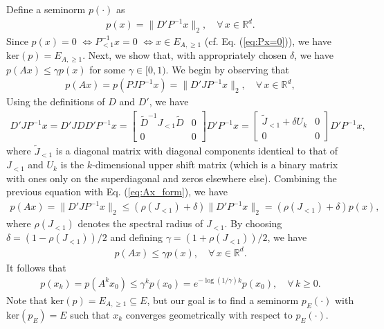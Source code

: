\documentclass[11 pt]{article}
\begin{document}
\begin{itemize}
		Define a seminorm $p(\cdot)$ as
		\begin{align}\label{eq:def:norm}
			p(x)= \| D' P^{-1} x \|_2, \quad \forall\, x \in  \mathbb{R}^d.
		\end{align}
		Since $p(x)=0$ $\Leftrightarrow P_{<1}^{-1}x=0$ $\Leftrightarrow x\in E_{A,\geq 1}$ (cf. Eq. (\ref{eq:Px=0})), we have $\text{ker}(p)=E_{A,\geq 1}$. 
		Next, we show that, with appropriately chosen $\delta$, we have $p(Ax)\leq \gamma p(x)$ for some $\gamma\in [0,1)$. We begin by observing that
		\begin{align}\label{eq:Ax_form}
			p(Ax)=p(PJP^{-1}x)=\|D'JP^{-1}x\|_2,\quad \forall\, x\in \mathbb{R}^d,
		\end{align}
		Using the definitions of $D$ and $D'$, we have
		\begin{align*}
			D'J P^{-1} x=D'JDD'P^{-1}x
			=\begin{bmatrix}
				\tilde{D}^{-1} J_{<1} \tilde{D}&  0\\
				0 & 0
			\end{bmatrix}D'P^{-1}x=\begin{bmatrix}
				\tilde{J}_{<1}+\delta U_k&  0\\
				0 & 0
			\end{bmatrix}D'P^{-1}x,
		\end{align*} 
		where $\tilde{J}_{<1}$ is a diagonal matrix with diagonal components identical to that of $J_{<1}$ and $U_k$ is the $k$-dimensional upper shift matrix (which is a binary matrix with ones only on the superdiagonal and zeros elsewhere else). Combining the previous equation with Eq. (\ref{eq:Ax_form}), we have
		\begin{align*}
			p(Ax)=\|D'JP^{-1}x\|_2\leq (\rho(J_{<1})+\delta)\|D'P^{-1}x\|_2=(\rho(J_{<1})+\delta) p(x),
		\end{align*}
		where $\rho(J_{<1})$ denotes the spectral radius of $J_{<1}$.
		By choosing $\delta=(1-\rho(J_{<1}))/2$ and defining $\gamma=(1+\rho(J_{<1}))/2$, we have  
		\begin{align*}
			p(Ax)\leq \gamma p(x),\quad \forall\,x\in \mathbb{R}^d.
		\end{align*}
		It follows that 
		\begin{align}\label{eq:geo_p_A>1}
			p(x_k)=p(A^kx_0)\leq \gamma^kp(x_0)=e^{-\log(1/\gamma)k}p(x_0),\quad \forall\,k\geq 0.
		\end{align}
		Note that $\text{ker}(p)=E_{A,\geq 1}\subseteq E$, but our goal is to find a seminorm $p_E(\cdot)$ with $\text{ker}(p_E)=E$ such that $x_k$ converges geometrically with respect to $p_E(\cdot)$. 
		

\end{itemize}
\end{document}
